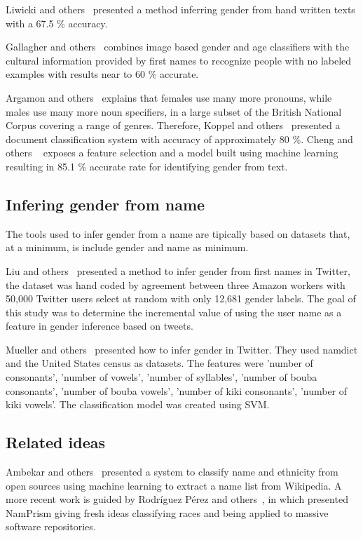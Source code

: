 \documentclass[a4paper]{article}
\begin{document}
Liwicki and others~\cite{liwicki2011automatic} presented a method
inferring gender from hand written texts with a 67.5 \% accuracy.

Gallagher and others~\cite{gallagher2008estimating} combines
image based gender and age classifiers with the cultural 
information provided by first names to recognize people
with no labeled examples with results near to 60 \% accurate.

Argamon and others~\cite{argamon2003gender} explains that
females use many more pronouns, while males use many more
noun specifiers, in a large subset of the British National
Corpus covering a range of genres. Therefore,
Koppel and others~\cite{koppel2002automatically} presented
a document classification system with accuracy of
approximately 80 \%. Cheng and others ~\cite{cheng2011author}
exposes a feature selection and a model built using machine learning
resulting in 85.1 \% accurate rate for identifying gender from text.

\subsection{Infering gender from name}

The tools used to infer gender from a name are tipically based on
datasets that, at a minimum, is include gender and name as minimum.

Liu and others~\cite{liu2013s} presented a method to infer gender
from first names in Twitter, the dataset was hand coded by agreement
between three Amazon workers with 50,000 Twitter users select at
random with only 12,681 gender labels. The goal of this study was
to determine the incremental value of using the user name as a feature
in gender inference based on tweets.

Mueller and others~\cite{mueller2016gender} presented how to
infer gender in Twitter. They used namdict and the United States
census as datasets. The features were 'number of consonants',
'number of vowels', 'number of syllables', 'number of bouba
consonants', 'number of bouba vowels', 'number of kiki consonants',
'number of kiki vowels'. The classification model was created using SVM.

\subsection{Related ideas}

Ambekar and others~\cite{ambekar2009name} presented a
system to classify name and ethnicity from open sources
using machine learning to extract a name list from Wikipedia.
A more recent work is guided by Rodríguez
Pérez and others~\cite{nadri2021relationship}, in
which presented NamPrism giving fresh ideas classifying
races and being applied to massive software repositories.
\end{document}
